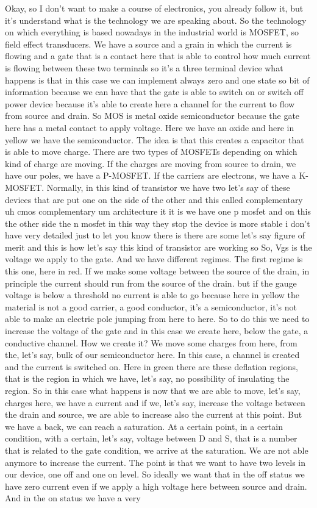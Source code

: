 Okay, so I don't want to make a course of electronics, you already follow it, but it's understand what is the technology we are speaking about. So the technology on which everything is based nowadays in the industrial world is MOSFET, so field effect transducers. We have a source and a grain in which the current is flowing and a gate that is a contact here that is able to control how much current is flowing between these two terminals so it's a three terminal device what happens is that in this case we can implement always zero and one state so bit of information because we can have that the gate is able to switch on or switch off power device because it's able to create here a channel for the current to flow from source and drain. So MOS is metal oxide semiconductor because the gate here has a metal contact to apply voltage. Here we have an oxide and here in yellow we have the semiconductor. The idea is that this creates a capacitor that is able to move charge. There are two types of MOSFETs depending on which kind of charge are moving. If the charges are moving from source to drain, we have our poles, we have a P-MOSFET. If the carriers are electrons, we have a K-MOSFET. Normally, in this kind of transistor we have two let's say of these devices that are put one on the side of the other and this called complementary uh cmos complementary um architecture it it is we have one p mosfet and on this the other side the n mosfet in this way they stop the device is more stable i don't have very detailed just to let you know there is there are some let's say figure of merit and this is how let's say this kind of transistor are working so So, Vgs is the voltage we apply to the gate. And we have different regimes. The first regime is this one, here in red. If we make some voltage between the source of the drain, in principle the current should run from the source of the drain. but if the gauge voltage is below a threshold no current is able to go because here in yellow the material is not a good carrier, a good conductor, it's a semiconductor, it's not able to make an electric pole jumping from here to here. So to do this we need to increase the voltage of the gate and in this case we create here, below the gate, a conductive channel. How we create it? We move some charges from here, from the, let's say, bulk of our semiconductor here. In this case, a channel is created and the current is switched on. Here in green there are these deflation regions, that is the region in which we have, let's say, no possibility of insulating the region. So in this case what happens is now that we are able to move, let's say, charges here, we have a current and if we, let's say, increase the voltage between the drain and source, we are able to increase also the current at this point. But we have a back, we can reach a saturation. At a certain point, in a certain condition, with a certain, let's say, voltage between D and S, that is a number that is related to the gate condition, we arrive at the saturation. We are not able anymore to increase the current. The point is that we want to have two levels in our device, one off and one on level. So ideally we want that in the off status we have zero current even if we apply a high voltage here between source and drain. And in the on status we have a very 